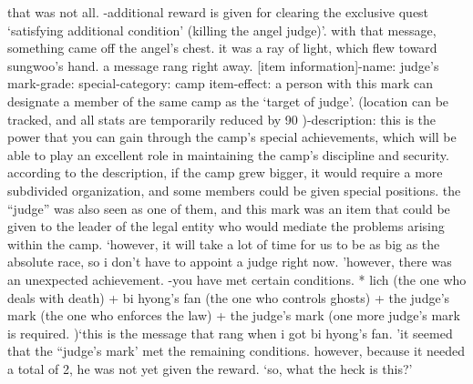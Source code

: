 that was not all.
-additional reward is given for clearing the exclusive quest ‘satisfying additional condition’ (killing the angel judge)’.
with that message, something came off the angel’s chest.
 it was a ray of light, which flew toward sungwoo’s hand.
 a message rang right away.
[item information]-name: judge’s mark-grade: special-category: camp item-effect: a person with this mark can designate a member of the same camp as the ‘target of judge’.
 (location can be tracked, and all stats are temporarily reduced by 90%
)-description: this is the power that you can gain through the camp’s special achievements, which will be able to play an excellent role in maintaining the camp’s discipline and security.
according to the description, if the camp grew bigger, it would require a more subdivided organization, and some members could be given special positions.
the “judge” was also seen as one of them, and this mark was an item that could be given to the leader of the legal entity who would mediate the problems arising within the camp.
‘however, it will take a lot of time for us to be as big as the absolute race, so i don’t have to appoint a judge right now.
’however, there was an unexpected achievement.
-you have met certain conditions.
* lich (the one who deals with death) + bi hyong’s fan (the one who controls ghosts) + the judge’s mark (the one who enforces the law) + the judge’s mark (one more judge’s mark is required.
)‘this is the message that rang when i got bi hyong’s fan.
’it seemed that the “judge’s mark’ met the remaining conditions.
 however, because it needed a total of 2, he was not yet given the reward.
‘so, what the heck is this?’

 